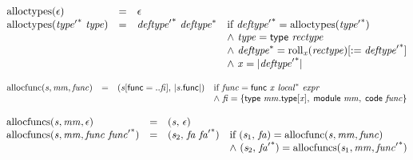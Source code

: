 \vspace{1ex}

$$
\begin{array}{@{}lcl@{}l@{}}
{\mathrm{alloctypes}}(\epsilon) &=& \epsilon &  \\
{\mathrm{alloctypes}}({{\mathit{type}'}^\ast}~{\mathit{type}}) &=& {{\mathit{deftype}'}^\ast}~{{\mathit{deftype}}^\ast} &\quad
  \mbox{if}~{{\mathit{deftype}'}^\ast} = {\mathrm{alloctypes}}({{\mathit{type}'}^\ast}) \\
 &&&\quad {\land}~{\mathit{type}} = \mathsf{type}~{\mathit{rectype}} \\
 &&&\quad {\land}~{{\mathit{deftype}}^\ast} = {{{\mathrm{roll}}}_{{\mathit{x}}}({\mathit{rectype}})}{{}[{ := }\;{{\mathit{deftype}'}^\ast}]} \\
 &&&\quad {\land}~{\mathit{x}} = {|{{\mathit{deftype}'}^\ast}|} \\
\end{array}
$$

$$
\begin{array}{@{}lcl@{}l@{}}
{\mathrm{allocfunc}}({\mathit{s}}, {\mathit{mm}}, {\mathit{func}}) &=& ({\mathit{s}}{}[\mathsf{func} = ..{\mathit{fi}}],\, {|{\mathit{s}}.\mathsf{func}|}) &\quad
  \mbox{if}~{\mathit{func}} = \mathsf{func}~{\mathit{x}}~{{\mathit{local}}^\ast}~{\mathit{expr}} \\
 &&&\quad {\land}~{\mathit{fi}} = \{ \begin{array}[t]{@{}l@{}}
\mathsf{type}~{\mathit{mm}}.\mathsf{type}{}[{\mathit{x}}],\; \mathsf{module}~{\mathit{mm}},\; \mathsf{code}~{\mathit{func}} \}\end{array} \\
\end{array}
$$

$$
\begin{array}{@{}lcl@{}l@{}}
{\mathrm{allocfuncs}}({\mathit{s}}, {\mathit{mm}}, \epsilon) &=& ({\mathit{s}},\, \epsilon) &  \\
{\mathrm{allocfuncs}}({\mathit{s}}, {\mathit{mm}}, {\mathit{func}}~{{\mathit{func}'}^\ast}) &=& ({\mathit{s}}_{{2}},\, {\mathit{fa}}~{{\mathit{fa}'}^\ast}) &\quad
  \mbox{if}~({\mathit{s}}_{{1}},\, {\mathit{fa}}) = {\mathrm{allocfunc}}({\mathit{s}}, {\mathit{mm}}, {\mathit{func}}) \\
 &&&\quad {\land}~({\mathit{s}}_{{2}},\, {{\mathit{fa}'}^\ast}) = {\mathrm{allocfuncs}}({\mathit{s}}_{{1}}, {\mathit{mm}}, {{\mathit{func}'}^\ast}) \\
\end{array}
$$


